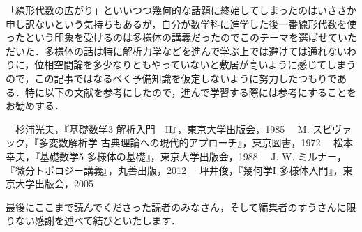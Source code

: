 「線形代数の広がり」といいつつ幾何的な話題に終始してしまったのはいささか申し訳ないという気持ちもあるが，自分が数学科に進学した後一番線形代数を使ったという印象を受けるのは多様体の講義だったのでこのテーマを選ばせていただいた．多様体の話は特に解析力学などを進んで学ぶ上では避けては通れないわりに，位相空間論を多少なりともやっていないと敷居が高いように感じてしまうので，この記事ではなるべく予備知識を仮定しないように努力したつもりである．特に以下の文献を参考にしたので，進んで学習する際には参考にすることをお勧めする．
\begin{thebibliography}{9}
\bibitem 　杉浦光夫，『基礎数学3 解析入門　II』，東京大学出版会，1985
\bibitem 　M. スピヴァック，『多変数解析学 古典理論への現代的アプローチ』，東京図書，1972
\bibitem 　松本幸夫，『基礎数学5 多様体の基礎』，東京大学出版会，1988
\bibitem 　J. W. ミルナー，『微分トポロジー講義』，丸善出版，2012
\bibitem 　坪井俊，『幾何学I 多様体入門』，東京大学出版会，2005
\end{thebibliography}
最後にここまで読んでくださった読者のみなさん，そして編集者のすうさんに限りない感謝を述べて結びといたします．
